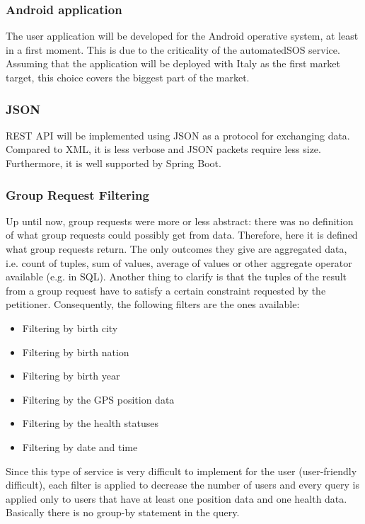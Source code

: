 \subsubsection{Android application} 	 
The user application will be developed for the Android operative system, at least in a first moment. This is due to the criticality of the
automatedSOS service. Assuming that the application will be deployed with Italy as the first market target, this choice covers the biggest
part of the market.

\subsubsection{JSON}
REST API will be implemented using JSON as a protocol for exchanging data. \\
Compared to XML, it is less verbose and JSON packets require less size. Furthermore, it is well supported
by Spring Boot. 

\subsubsection{Group Request Filtering}
Up until now, group requests were more or less abstract: there was no definition of what group requests could possibly get from 
data. Therefore, here it is defined what group requests return. The only outcomes they give are  aggregated data, i.e. count 
of tuples, sum of values, average of values or other aggregate operator available (e.g. in SQL). Another thing to clarify is that 
the tuples of the result from a group request have to satisfy a certain constraint requested by the petitioner. Consequently, 
the following filters are the ones available:
\begin{itemize}
\item Filtering by birth city
\item Filtering by birth nation
\item Filtering by birth year
\item Filtering by the GPS position data
\item Filtering by the health statuses
\item Filtering by date and time
\end{itemize}
Since this type of service is very difficult to implement for the user (user-friendly difficult), each filter is applied to decrease the number of users and every query is applied only to users that have at least one position data and one health data. Basically there is no group-by statement in the query.